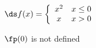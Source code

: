 {%
$\ds f(x) = \left\{\begin{array}{cc} x^2 & x\leq 0 \\ x & x> 0 \end{array} \right.$

}
{$\fp(0)$ is not defined
}
